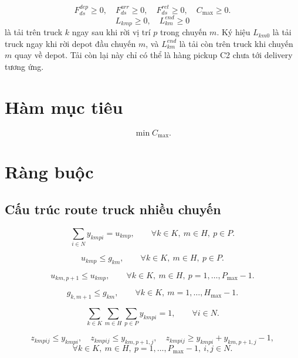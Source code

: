 \documentclass[12pt,a4paper]{article}
\begin{document}
\[
F^{dep}_{ds}\ge0,\quad F^{arr}_{ds}\ge0,\quad F^{ret}_{ds}\ge0,\quad C_{\max}\ge0.
\]
\[
L_{kmp}\ge0,\quad L^{end}_{km}\ge0
\]
là tải trên truck \(k\) ngay sau khi rời vị trí \(p\) trong chuyến \(m\). Ký hiệu
\(L_{km0}\) là tải truck ngay khi rời depot đầu chuyến \(m\), và \(L^{end}_{km}\)
là tải còn trên truck khi chuyến \(m\) quay về depot. Tải còn lại này chỉ có thể là
hàng pickup C2 chưa tới delivery tương ứng.

\section{Hàm mục tiêu}

\[
  \min C_{\max}.
\]

\section{Ràng buộc}

\subsection{Cấu trúc route truck nhiều chuyến}

\begin{equation}
  \sum_{i\in N} y_{kmpi}=u_{kmp},
  \qquad \forall k\in K,\ m\in H,\ p\in P.
\end{equation}

\begin{equation}
  u_{kmp}\le g_{km},
  \qquad \forall k\in K,\ m\in H,\ p\in P.
\end{equation}

\begin{equation}
  u_{km,p+1}\le u_{kmp},
  \qquad \forall k\in K,\ m\in H,\ p=1,\ldots,P_{\max}-1.
\end{equation}

\begin{equation}
  g_{k,m+1}\le g_{km},
  \qquad \forall k\in K,\ m=1,\ldots,H_{\max}-1.
\end{equation}

\begin{equation}
  \sum_{k\in K}\sum_{m\in H}\sum_{p\in P} y_{kmpi}=1,
  \qquad \forall i\in N.
\end{equation}

\begin{equation}
  z_{kmpij}\le y_{kmpi},\quad
  z_{kmpij}\le y_{km,p+1,j},\quad
  z_{kmpij}\ge y_{kmpi}+y_{km,p+1,j}-1,
\end{equation}
\[
  \forall k\in K,\ m\in H,\ p=1,\ldots,P_{\max}-1,\ i,j\in N.
\]
\end{document}
